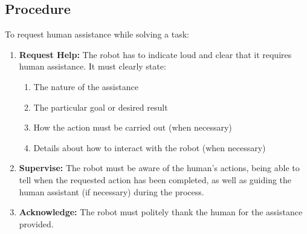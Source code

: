
\subsection{Procedure}
\label{sec:rules:demprocedure}
To request human assistance while solving a task:

\begin{enumerate}
	\item \textbf{Request Help:} The robot has to indicate loud and clear that it requires human assistance. It must clearly state:
	\begin{enumerate}
		\item The nature of the assistance
		\item The particular goal or desired result
		\item How the action must be carried out (when necessary)
		\item Details about how to interact with the robot (when necessary)
	\end{enumerate}

	\item \textbf{Supervise:} The robot must be aware of the human's actions, being able to tell when the requested action has been completed, as well as guiding the human assistant (if necessary) during the process.

	\item \textbf{Acknowledge:} The robot must politely thank the human for the assistance provided.
\end{enumerate}


